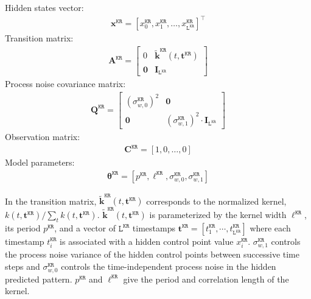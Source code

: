 Hidden states vector: 
\begin{gather*}
\mathbf{x}^{\mathtt{KR}} = [x^{\mathtt{KR}}_{0}, x^{\mathtt{KR}}_{1}, \dots, x^{\mathtt{KR}}_{\mathtt{L}^{\mathtt{KR}}}]^{\intercal}
\end{gather*}
Transition matrix: 
\begin{gather*}
\mathbf{A}^{\mathtt{KR}}= \left[\begin{array}{cc}0 &\tilde{\bm k}^{\mathtt{KR}}(t, \mathbf{t}^{\mathtt{KR}})\\\mathbf{0}&\mathbf{I}_{\mathtt{L}^{\mathtt{KR}}}\end{array}\right]
\end{gather*}
Process noise covariance matrix:
\begin{gather*}
\mathbf{Q}^{\mathtt{KR}}=\left[\begin{array}{cc}(\sigma_{w,0}^{\mathtt{KR}})^{2} &\mathbf{0}\\\mathbf{0}&(\sigma_{w,1}^{\mathtt{KR}})^{2}\cdot\mathbf{I}_{\mathtt{L}^{\mathtt{KR}} }\end{array}\right]
\end{gather*}
Observation matrix: 
\begin{gather*}
\mathbf{C}^{\mathtt{KR}}=[1, 0, \dots, 0]
\end{gather*}
Model parameters: 
\begin{gather*}
\bm\theta^{\mathtt{KR}}=[ p^{\mathtt{KR}},\ell^{\mathtt{KR}},  \sigma_{w,0}^{\mathtt{KR}}, \sigma_{w,1}^{\mathtt{KR}}]
\end{gather*}

\noindent
In the transition matrix, $\tilde{\bm k}^{\mathtt{KR}}(t,\mathbf{t}^{\mathtt{KR}})$ corresponds to the normalized kernel, $k(t,\mathbf{t}^{\mathtt{KR}})/\sum_{t} k(t,\mathbf{t}^{\mathtt{KR}})$. $\tilde{\bm k}^{\mathtt{KR}}(t,\mathbf{t}^{\mathtt{KR}})$ is parameterized by the kernel width $\ell^{\mathtt{KR}}$, its period $p^{\mathtt{KR}}$, and a vector of $\mathtt{L}^{\mathtt{KR}}$ timestamps $\mathbf{t}^{\mathtt{KR}}=[t_{1}^{\mathtt{KR}},\cdots,t_{\mathtt{L}^{\mathtt{KR}}}^{\mathtt{KR}}]$ where each timestamp $t_{i}^{\mathtt{KR}}$ is associated with a hidden control point value $x_{i}^{\mathtt{KR}}$. 
$\sigma_{w,1}^{\mathtt{KR}}$ controls the process noise  variance of the hidden control points between successive time steps and $\sigma_{w,0}^{\mathtt{KR}}$ controls the time-independent process noise in the hidden predicted pattern.
$p^{\mathtt{KR}}$ and $\ell^{\mathtt{KR}}$ give the period and correlation length of the kernel.


